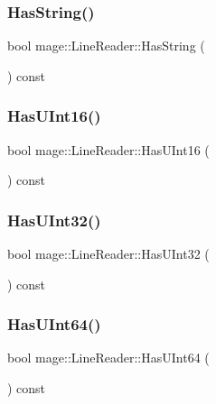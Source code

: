 \subsubsection{\texorpdfstring{Has\+String()}{HasString()}}
{\footnotesize\ttfamily bool mage\+::\+Line\+Reader\+::\+Has\+String (\begin{DoxyParamCaption}{ }\end{DoxyParamCaption}) const\hspace{0.3cm}{\ttfamily [protected]}}

\hypertarget{classmage_1_1_line_reader_a15c7c3336330649062556e5b318af510}{}\label{classmage_1_1_line_reader_a15c7c3336330649062556e5b318af510} 
\subsubsection{\texorpdfstring{Has\+U\+Int16()}{HasUInt16()}}
{\footnotesize\ttfamily bool mage\+::\+Line\+Reader\+::\+Has\+U\+Int16 (\begin{DoxyParamCaption}{ }\end{DoxyParamCaption}) const\hspace{0.3cm}{\ttfamily [protected]}}

\hypertarget{classmage_1_1_line_reader_a56f82d5562d0254ec59871a3bb7ad837}{}\label{classmage_1_1_line_reader_a56f82d5562d0254ec59871a3bb7ad837} 
\subsubsection{\texorpdfstring{Has\+U\+Int32()}{HasUInt32()}}
{\footnotesize\ttfamily bool mage\+::\+Line\+Reader\+::\+Has\+U\+Int32 (\begin{DoxyParamCaption}{ }\end{DoxyParamCaption}) const\hspace{0.3cm}{\ttfamily [protected]}}

\hypertarget{classmage_1_1_line_reader_ad311b6edbfc68c01997f90cd1db5d95e}{}\label{classmage_1_1_line_reader_ad311b6edbfc68c01997f90cd1db5d95e} 
\subsubsection{\texorpdfstring{Has\+U\+Int64()}{HasUInt64()}}
{\footnotesize\ttfamily bool mage\+::\+Line\+Reader\+::\+Has\+U\+Int64 (\begin{DoxyParamCaption}{ }\end{DoxyParamCaption}) const\hspace{0.3cm}{\ttfamily [protected]}}

